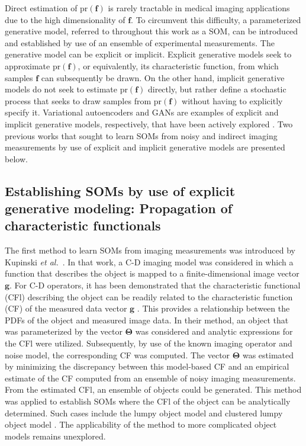\documentclass[journal]{IEEEtran}
\begin{document}
Direct estimation of $\textrm{pr}(\mathbf{f})$ is rarely tractable in medical imaging applications due 
to the high dimensionality of $\mathbf{f}$.
To circumvent this difficulty, a parameterized generative model, referred to throughout this work as
a SOM,  can be introduced and established
by use of an ensemble of experimental measurements. The generative model can be explicit
or implicit.
Explicit generative models seek to approximate $\textrm{pr}(\mathbf{f})$, or equivalently, its
characteristic function,  from which samples
$\mathbf{f}$ can subsequently be drawn. 
On the other hand, implicit generative models do not seek to estimate $\textrm{pr}(\mathbf{f})$ directly,
 but rather define a stochastic process that seeks to draw samples
from $\textrm{pr}(\mathbf{f})$ without having to explicitly specify it.  Variational autoencoders and GANs are examples
 of  explicit and implicit generative models, respectively, that have
been actively explored \cite{goodfellow2016deeplearning}.
Two previous works that sought to learn SOMs from noisy and indirect imaging measurements  by use of explicit and implicit generative
models are presented below.


\subsection{Establishing SOMs by use of explicit generative modeling: Propagation
of characteristic functionals}
\label{ssec:CFforSOM}

The first method to learn SOMs from imaging measurements was introduced by
Kupinski \textit{et al.}~\cite{kupinski2003experimental}.
In that work, a C-D imaging model was considered in which a function that describes the object is mapped to a finite-dimensional image vector
$\mathbf{g}$.
For C-D operators, it has been demonstrated that 
 the characteristic functional (CFl) describing the object 
 can be readily related to the characteristic function (CF) 
of the measured data vector $\mathbf{g}$ \cite{clarkson2002transformation}.
 This provides  a
relationship between the PDFs of the object and measured image data.
In their method, an object that was parameterized by
the vector $\mathbf{\Theta}$ was considered and
analytic expressions for the CFl were utilized.
Subsequently, by use of the known imaging operator and noise model,
  the corresponding CF  was computed. The vector $\mathbf{\Theta}$
was estimated by 
 minimizing the discrepancy between this model-based CF and
an empirical estimate of the CF computed from an ensemble of noisy
imaging measurements. From the estimated CFl,
an ensemble of objects could be generated.
This method was applied to establish SOMs where the CFl of the object can
be analytically determined. 
Such cases include the
lumpy object model\cite{kupinski2005small} and
 clustered lumpy object model \cite{bochud1999statistical}.
The applicability of the method to more complicated object
models  remains unexplored.
\end{document}
